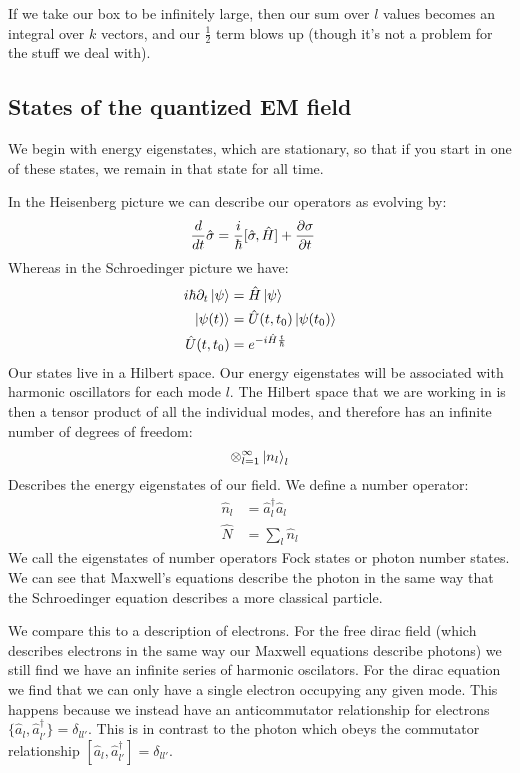 If we take our box to be infinitely large, then our sum over $l$ values becomes an integral over $k$ vectors, and our $\frac{1}{2}$ term blows up (though it's not a problem for the stuff we deal with).
\subsection{States of the quantized EM field}
We begin with energy eigenstates, which are stationary, so that if you start in one of these states, we remain in that state for all time.

In the Heisenberg picture we can describe our operators as evolving by:
\begin{align*}
	\frac{d}{dt} \hat{\sigma} &= \frac{i}{\hbar} [\hat{\sigma},\hat{H}] + \frac{\partial \sigma}{\partial t}
\end{align*}
Whereas in the Schroedinger picture we have:
\begin{align*}
	i\hbar \partial_t \ket{\psi} &= \hat{H}\ket{\psi} \\
	\ket{\psi(t)} &= \hat{U}(t,t_0)\ket{\psi(t_0)} \\
	\hat{U}(t,t_0) &= e^{-i\hat{H} \frac{t}{\hbar}}
\end{align*}
Our states live in a Hilbert space. Our energy eigenstates will be associated with harmonic oscillators for each mode $l$.
The Hilbert space that we are working in is then a tensor product of all the individual modes, and therefore has an infinite number of degrees of freedom:
\begin{align*}
	\otimes_{l=1}^\infty \ket{n_l}_l
\end{align*}
Describes the energy eigenstates of our field.
We define a number operator:
\begin{align*}
	\hat{n}_l &= \hat{a}^\dagger_l \hat{a}_l \\
	\hat{N} &= \sum_l \hat{n}_l
\end{align*}
We call the eigenstates of number operators Fock states or photon number states. We can see that Maxwell's equations describe the photon in the same way that the Schroedinger equation describes a more classical particle.

We compare this to a description of electrons. For the free dirac field (which describes electrons in the same way our Maxwell equations describe photons) we still find we have an infinite series of harmonic oscilators.
For the dirac equation we find that we can only have a single electron occupying any given mode. This happens because we instead have an anticommutator relationship for electrons $\{\hat{a}_l,\hat{a}_{l'}^\dagger\} = \delta_{ll'}$.
This is in contrast to the photon which obeys the commutator relationship $[\hat{a}_l,\hat{a}_{l'}^\dagger] = \delta_{ll'}$.

